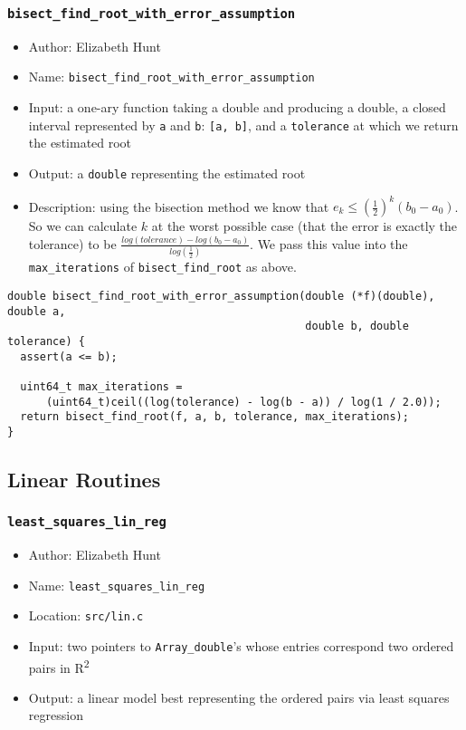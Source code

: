 \documentclass[11pt]{article}
\begin{document}
\subsubsection{\texttt{bisect\_find\_root\_with\_error\_assumption}}
\label{sec:orgf5124e7}
\begin{itemize}
\item Author: Elizabeth Hunt
\item Name: \texttt{bisect\_find\_root\_with\_error\_assumption}
\item Input: a one-ary function taking a double and producing a double, a closed interval represented
by \texttt{a} and \texttt{b}: \texttt{[a, b]}, and a \texttt{tolerance} at which we return the estimated root
\item Output: a \texttt{double} representing the estimated root
\item Description: using the bisection method we know that \(e_k \le (\frac{1}{2})^k (b_0 - a_0)\). So we can
calculate \(k\) at the worst possible case (that the error is exactly the tolerance) to be
\(\frac{log(tolerance) - log(b_0 - a_0)}{log(\frac{1}{2})}\). We pass this value into the \texttt{max\_iterations}
of \texttt{bisect\_find\_root} as above.
\end{itemize}
\begin{verbatim}
double bisect_find_root_with_error_assumption(double (*f)(double), double a,
                                              double b, double tolerance) {
  assert(a <= b);

  uint64_t max_iterations =
      (uint64_t)ceil((log(tolerance) - log(b - a)) / log(1 / 2.0));
  return bisect_find_root(f, a, b, tolerance, max_iterations);
}
\end{verbatim}

\subsection{Linear Routines}
\label{sec:org6f4fce5}
\subsubsection{\texttt{least\_squares\_lin\_reg}}
\label{sec:orge810f5f}
\begin{itemize}
\item Author: Elizabeth Hunt
\item Name: \texttt{least\_squares\_lin\_reg}
\item Location: \texttt{src/lin.c}
\item Input: two pointers to \texttt{Array\_double}'s whose entries correspond two ordered
pairs in R\textsuperscript{2}
\item Output: a linear model best representing the ordered pairs via least squares
regression
\end{itemize}
\end{document}
